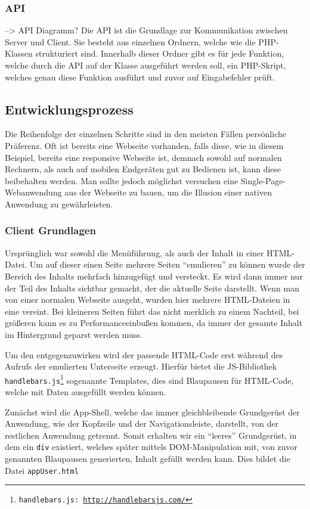 \documentclass[a4paper,12pt,ngerman,listof=numbered]{scrartcl}      %
\let\oldcite\cite
\renewcommand{\cite}[1]{\textsuperscript{\oldcite{#1}}}
\providecommand{\inlinecode}[1]{\texttt{#1}}
\begin{document}
	\subsubsection{API}
	--> API Diagramm?
	Die API ist die Grundlage zur Kommunikation zwischen Server und Client. Sie besteht aus einzelnen Ordnern, welche wie die PHP-Klassen strukturiert sind. Innerhalb dieser Ordner gibt es für jede Funktion, welche durch die API auf der Klasse ausgeführt werden soll, ein PHP-Skript, welches genau diese Funktion ausführt und zuvor auf Eingabefehler prüft.\par
	
	\subsection{Entwicklungsprozess}
	Die Reihenfolge der einzelnen Schritte sind in den meisten Fällen persönliche Präferenz. Oft ist bereits eine Webseite vorhanden, falls diese, wie in diesem Beispiel, bereits eine responsive Webseite ist, demnach sowohl auf normalen Rechnern, als auch auf mobilen Endgeräten gut zu Bedienen ist, kann diese beibehalten werden. Man sollte jedoch möglichst versuchen eine Single-Page-Webanwendung\cite{singlePageWiki} aus der Webseite zu bauen, um die Illusion einer nativen Anwendung zu gewährleisten.\par
	
	\subsubsection{Client Grundlagen}
	Ursprünglich war sowohl die Me\-nü\-füh\-rung, als auch der Inhalt in einer HTML-Datei. Um auf dieser einen Seite mehrere Seiten ``emulieren'' zu können wurde der Bereich des Inhalts mehrfach hinzugefügt und versteckt. Es wird dann immer nur der Teil des Inhalts sichtbar gemacht, der die aktuelle Seite darstellt. Wenn man von einer normalen Webseite ausgeht, wurden hier mehrere HTML-Dateien in eine vereint. Bei kleineren Seiten führt das nicht merklich zu einem Nachteil, bei größeren kann es zu Performanceeinbußen kommen, da immer der gesamte Inhalt im Hintergrund geparst werden muss.\par
	Um den entgegenzuwirken wird der passende HTML-Code erst während des Aufrufs der emulierten Unterseite erzeugt. Hierfür bietet die JS-Bibliothek \inlinecode{handle\-bars.js\footnote{\inlinecode{handlebars.js}: \url{http://handlebarsjs.com/}}} sogenannte Templates, dies sind Blaupausen für HTML-Code, welche mit Daten ausgefüllt werden können.\par
	Zunächst wird die App-Shell, welche das immer gleichbleibende Grundgerüst der Anwendung, wie der Kopfzeile und der Navigations\-leiste, darstellt, von der restlichen Anwendung getrennt. Somit erhalten wir ein ``leeres'' Grundgerüst, in dem ein \inlinecode{div} existiert, welches später mittels DOM-Manipulation mit, von zuvor genannten Blaupausen generierten, Inhalt gefüllt werden kann. Dies bildet die Datei \inlinecode{appUser.html}\par
\end{document}
